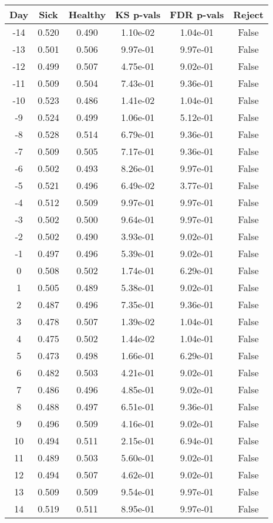\begin{tabular}{c|c|c|c|c|c}
Day &  Sick & Healthy &  KS p-vals & FDR p-vals & Reject\\
\hline
-14 & 0.520 &   0.490 &   1.10e-02 &   1.04e-01 &  False\\
-13 & 0.501 &   0.506 &   9.97e-01 &   9.97e-01 &  False\\
-12 & 0.499 &   0.507 &   4.75e-01 &   9.02e-01 &  False\\
-11 & 0.509 &   0.504 &   7.43e-01 &   9.36e-01 &  False\\
-10 & 0.523 &   0.486 &   1.41e-02 &   1.04e-01 &  False\\
 -9 & 0.524 &   0.499 &   1.06e-01 &   5.12e-01 &  False\\
 -8 & 0.528 &   0.514 &   6.79e-01 &   9.36e-01 &  False\\
 -7 & 0.509 &   0.505 &   7.17e-01 &   9.36e-01 &  False\\
 -6 & 0.502 &   0.493 &   8.26e-01 &   9.97e-01 &  False\\
 -5 & 0.521 &   0.496 &   6.49e-02 &   3.77e-01 &  False\\
 -4 & 0.512 &   0.509 &   9.97e-01 &   9.97e-01 &  False\\
 -3 & 0.502 &   0.500 &   9.64e-01 &   9.97e-01 &  False\\
 -2 & 0.502 &   0.490 &   3.93e-01 &   9.02e-01 &  False\\
 -1 & 0.497 &   0.496 &   5.39e-01 &   9.02e-01 &  False\\
  0 & 0.508 &   0.502 &   1.74e-01 &   6.29e-01 &  False\\
  1 & 0.505 &   0.489 &   5.38e-01 &   9.02e-01 &  False\\
  2 & 0.487 &   0.496 &   7.35e-01 &   9.36e-01 &  False\\
  3 & 0.478 &   0.507 &   1.39e-02 &   1.04e-01 &  False\\
  4 & 0.475 &   0.502 &   1.44e-02 &   1.04e-01 &  False\\
  5 & 0.473 &   0.498 &   1.66e-01 &   6.29e-01 &  False\\
  6 & 0.482 &   0.503 &   4.21e-01 &   9.02e-01 &  False\\
  7 & 0.486 &   0.496 &   4.85e-01 &   9.02e-01 &  False\\
  8 & 0.488 &   0.497 &   6.51e-01 &   9.36e-01 &  False\\
  9 & 0.496 &   0.509 &   4.16e-01 &   9.02e-01 &  False\\
 10 & 0.494 &   0.511 &   2.15e-01 &   6.94e-01 &  False\\
 11 & 0.489 &   0.503 &   5.60e-01 &   9.02e-01 &  False\\
 12 & 0.494 &   0.507 &   4.62e-01 &   9.02e-01 &  False\\
 13 & 0.509 &   0.509 &   9.54e-01 &   9.97e-01 &  False\\
 14 & 0.519 &   0.511 &   8.95e-01 &   9.97e-01 &  False\\
\end{tabular}